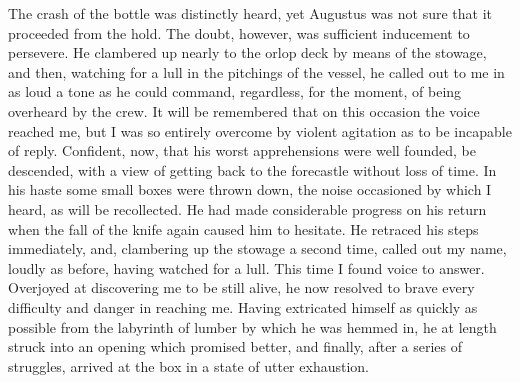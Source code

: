 The crash of the bottle was distinctly heard, yet Augustus was not sure that
it proceeded from the hold. The doubt, however, was sufficient inducement to
persevere. He clambered up nearly to the orlop deck by means of the stowage, and
then, watching for a lull in the pitchings of the vessel, he called out to me in
as loud a tone as he could command, regardless, for the moment, of being
overheard by the crew. It will be remembered that on this occasion the voice
reached me, but I was so entirely overcome by violent agitation as to be
incapable of reply. Confident, now, that his worst apprehensions were well
founded, be descended, with a view of getting back to the forecastle without
loss of time. In his haste some small boxes were thrown down, the noise
occasioned by which I heard, as will be recollected. He had made considerable
progress on his return when the fall of the knife again caused him to hesitate.
He retraced his steps immediately, and, clambering up the stowage a second time,
called out my name, loudly as before, having watched for a lull. This time I
found voice to answer. Overjoyed at discovering me to be still alive, he now
resolved to brave every difficulty and danger in reaching me. Having extricated
himself as quickly as possible from the labyrinth of lumber by which he was
hemmed in, he at length struck into an opening which promised better, and
finally, after a series of struggles, arrived at the box in a state of utter
exhaustion. 

